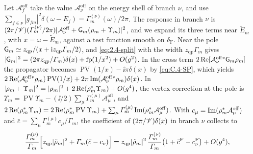 Let $\mathcal{A}^{\mathrm{off}}_f$ take the value $\mathcal{A}^{\mathrm{off}}_\nu$ on the energy shell of branch $\nu$, and use $\sum_{f\in\nu}|g_{fm}|^2\delta(\omega - E_f) = \varGamma^{(\nu)}_m(\omega)/2\pi$. The response in branch $\nu$ is $(2\pi/\mathscr{V})(\varGamma^{(\nu)}_m/2\pi)|\mathcal{A}^{\mathrm{off}}_\nu + \mathsf{G}_m(\rho_m + \Upsilon_m)|^2$, and we expand its three terms near $\tilde E_m$, with $x = \omega - \tilde E_m$, against a test function smooth on $\delta_{\mathrm{F}}$. Near the pole $\mathsf{G}_m \simeq z_{\mathrm{qp}}/(x + \mathrm{i} z_{\mathrm{qp}}\varGamma_m/2)$, and \cref{eq:2.4-split} with the width $z_{\mathrm{qp}}\varGamma_m$ gives $|\mathsf{G}_m|^2 = (2\pi z_{\mathrm{qp}}/\varGamma_m)\delta(x) + \operatorname{fp}(1/x^2) + O(g^2)$. In the cross term $2\operatorname{Re}[\mathcal{A}^{\mathrm{off}*}_\nu\mathsf{G}_m\rho_m]$ the propagator becomes $\operatorname{PV}(1/x) - \ii\pi\delta(x)$ by \cref{eq:C.4-SP}, which yields $2\operatorname{Re}(\mathcal{A}^{\mathrm{off}*}_\nu\rho_m)\operatorname{PV}(1/x) + 2\pi\operatorname{Im}(\mathcal{A}^{\mathrm{off}*}_\nu\rho_m)\delta(x)$. In $|\rho_m + \Upsilon_m|^2 = |\rho_m|^2 + 2\operatorname{Re}(\rho_m^*\Upsilon_m) + O(g^4)$, the vertex correction at the pole is $\Upsilon_m = \operatorname{PV}\Upsilon_m - (\ii/2)\sum_\mu\varGamma^{(\mu)}_m\mathcal{A}^{\mathrm{off}}_\mu$, and $2\operatorname{Re}(\rho_m^*\Upsilon_m) = 2\operatorname{Re}(\rho_m^*\operatorname{PV}\Upsilon_m) + \sum_\mu\varGamma^{(\mu)}_m\operatorname{Im}(\rho_m^*\mathcal{A}^{\mathrm{off}}_\mu)$. With $c_\mu = \operatorname{Im}(\rho_m^*\mathcal{A}^{\mathrm{off}}_\mu)$ and $\bar c = \sum_\mu\varGamma^{(\mu)}_mc_\mu/\varGamma_m$, the coefficient of $(2\pi/\mathscr{V})\delta(x)$ in branch $\nu$ collects to
\begin{equation}
  \frac{\varGamma^{(\nu)}_m}{\varGamma_m}\Bigl[z_{\mathrm{qp}}|\tilde\rho_m|^2 + \varGamma_m(\bar c - c_\nu)\Bigr]
  = z_{\mathrm{qp}}|\tilde\rho_m|^2\,\frac{\varGamma^{(\nu)}_m}{\varGamma_m}\bigl(1 + \bar c^{\mathrm{F}} - c^{\mathrm{F}}_\nu\bigr) + O(g^4) ,
  \label{eq:D.28-delta}
\end{equation}
